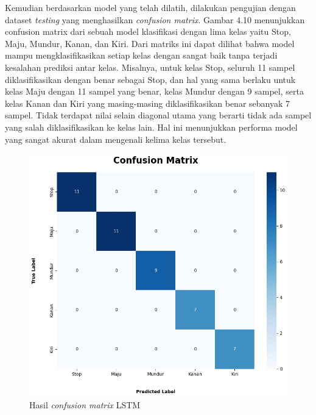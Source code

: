 Kemudian berdasarkan model yang telah dilatih, dilakukan pengujian dengan dataset \emph{testing} yang menghasilkan \emph{confusion matrix}.
Gambar 4.10 menunjukkan confusion matrix dari sebuah model klasifikasi dengan lima kelas yaitu Stop, Maju, Mundur, Kanan, dan Kiri. Dari matriks ini dapat dilihat bahwa model mampu
mengklasifikasikan setiap kelas dengan sangat baik tanpa terjadi kesalahan prediksi antar kelas. Misalnya, untuk kelas Stop, seluruh 11 sampel diklasifikasikan dengan benar sebagai Stop, 
dan hal yang sama berlaku untuk kelas Maju dengan 11 sampel yang benar, kelas Mundur dengan 9 sampel, serta kelas Kanan dan Kiri yang masing-masing diklasifikasikan benar sebanyak 7 sampel. 
Tidak terdapat nilai selain diagonal utama yang berarti tidak ada sampel yang salah diklasifikasikan ke kelas lain. Hal ini menunjukkan performa model yang sangat akurat dalam mengenali kelima kelas tersebut. 
\begin{figure} [H] \centering
  \includegraphics[scale=0.5]{gambar/confusion matrix lstm.jpg}
  \caption{Hasil \emph{confusion matrix} LSTM}
  \label{fig:Grafik confusion matrix lstm}
\end{figure}


